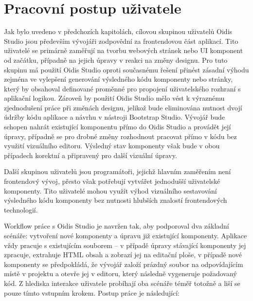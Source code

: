 \section{Pracovní postup uživatele}
Jak bylo uvedeno v předchozích kapitolách, cílovou skupinou uživatelů Oidis Studio jsou především vývojáři zodpovědní za frontendovou část aplikací. Tito uživatelé se primárně zaměřují na tvorbu webových stránek nebo UI komponent od začátku, případně na jejich úpravy v reakci na změny designu. Pro tuto skupinu má použití Oidis Studio oproti současnému řešení přinést zásadní výhodu zejména ve vylepšení generování výsledného kódu komponenty nebo stránky, který by obsahoval definované proměnné pro propojení uživatelského rozhraní s aplikační logikou. Zároveň by použití Oidis Studio mělo vést k výraznému zjednodušení práce při změnách designu, jelikož bude eliminována nutnost dvojí údržby kódu aplikace a návrhu v nástroji Bootstrap Studio. Vývojář bude schopen nahrát existující komponentu přímo do Oidis Studio a provádět její úpravy, případně se pro drobné změny rozhodnout pracovat přímo v kódu bez využití vizuálního editoru. Výsledný stav komponenty však bude v obou případech korektní a připravený pro další vizuální úpravy. 

Další skupinou uživatelů jsou programátoři, jejichž hlavním zaměřením není frontendový vývoj, přesto však potřebují vytvářet jednodušší uživatelské komponenty. Tito uživatelé mohou využít výhod vizuálního sestavování výsledného kódu komponenty bez nutnosti hlubších znalostí frontendových technologií.

Workflow práce s Oidis Studio je navržen tak, aby podporoval dva základní scénáře: vytvoření nové komponenty a úpravu již existující komponenty. Aplikace vždy pracuje s existujícím souborem -- v případě úpravy stávající komponenty jej zpracuje, extrahuje HTML obsah a zobrazí jej na editační ploše, v případě nové komponenty se předpokládá, že vývojář založí prázdný soubor na odpovídajícím místě v projektu a otevře jej v editoru, který následně vygeneruje požadovaný kód. Z hlediska interakce uživatele probíhají oba scénáře téměř totožně a liší se pouze tímto vstupním krokem. Postup práce je následující:

